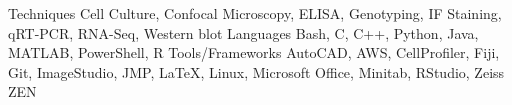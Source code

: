 \begin{cvskills}
  \cvskill
    {Techniques} %
    {Cell Culture, Confocal Microscopy, ELISA, Genotyping, IF Staining, qRT-PCR, RNA-Seq, Western blot} %
  \cvskill
    {Languages} %
    {Bash, C, C++, Python, Java, MATLAB, PowerShell, R} %
  \cvskill
    {Tools/Frameworks} %
    {AutoCAD, AWS, CellProfiler, Fiji, Git, ImageStudio, JMP, LaTeX, Linux, Microsoft Office, Minitab, RStudio, Zeiss ZEN} %
\end{cvskills}